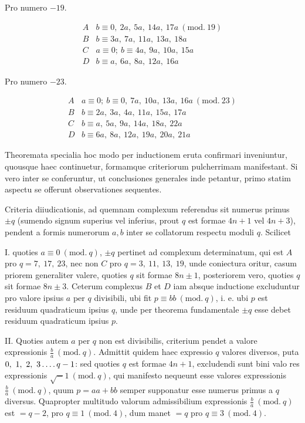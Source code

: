 %
\begin{center}Pro numero $-19$.\end{center}
\[
\begin{array}{c|l}
A&b\equiv0,\ 2a,\ 5a,\ 14a,\ 17a\ (\mathrm{mod.}\ 19)\\
B&b\equiv3a,\ 7a,\ 11a,\ 13a,\ 18a\\
C&a\equiv0;\ b\equiv4a,\ 9a,\ 10a,\ 15a\\
D&b\equiv a,\ 6a,\ 8a,\ 12a,\ 16a
\end{array}
\]

\begin{center}Pro numero $-23$.\end{center}
\[
\begin{array}{c|l}
A&a\equiv0;\ b\equiv0,\ 7a,\ 10a,\ 13a,\ 16a\ (\mathrm{mod.}\ 23)\\
B&b\equiv2a,\ 3a,\ 4a,\ 11a,\ 15a,\ 17a\\
C&b\equiv a,\ 5a,\ 9a,\ 14a,\ 18a,\ 22a\\
D&b\equiv6a,\ 8a,\ 12a,\ 19a,\ 20a,\ 21a
\end{array}
\]

Theoremata specialia hoc modo per inductionem eruta confirmari inveniuntur, quousque haec continuetur, formamque criteriorum pulcherrimam manifestant. Si vero inter se conferuntur, ut conclusiones generales inde petantur, primo statim aspectu se offerunt observationes sequentes.

Criteria diiudicationis, ad quemnam complexum referendus sit numerus primus $\pm q$ (sumendo signum superius vel inferius, prout $q$ est formae $4n+1$ vel $4n+3$), pendent a formis numerorum $a,b$ inter se collatorum respectu moduli $q$. Scilicet

I. quoties $a\equiv0\ (\mathrm{mod.}\ q)$, $\pm q$ pertinet ad complexum determinatum, qui est $A$ pro $q=7,\ 17,\ 23$, nec non $C$ pro $q=3,\ 11,\ 13,\ 19$, unde coniectura oritur, casum priorem generaliter valere, quoties $q$ sit formae $8n\pm1$, posteriorem vero, quoties $q$ sit formae $8n\pm3$. Ceterum complexus $B$ et $D$ iam absque inductione excluduntur pro valore ipsius $a$ per $q$ divisibili, ubi fit $p\equiv bb\ (\mathrm{mod.}\ q)$, i. e. ubi $p$ est residuum quadraticum ipsius $q$, unde per theorema fundamentale $\pm q$ esse debet residuum quadraticum ipsius $p$.

II. Quoties autem $a$ per $q$ non est divisibilis, criterium pendet a valore expressionis $\frac ba\ (\mathrm{mod.}\ q)$. Admittit quidem haec expressio $q$ valores diversos, puta $0,\ 1,\ 2,\ 3\mathinner{.\,.\,.\,.} q-1$: sed quoties $q$ est formae $4n+1$, excludendi sunt bini valo%
%
res expressionis $\surd-1\ (\mathrm{mod.}\ q)$, qui manifesto nequeunt esse valores expressionis $\frac ba\ (\mathrm{mod.}\ q)$, quum $p=aa+bb$ semper supponatur esse numerus primus a $q$ diversus. Quapropter multitudo valorum admissibilium expressionis $\frac ba\ (\mathrm{mod.}\ q)$ est $=q-2$, pro $q\equiv1\ (\mathrm{mod.}\ 4)$, dum manet $=q$ pro $q\equiv3\ (\mathrm{mod.}\ 4)$.

